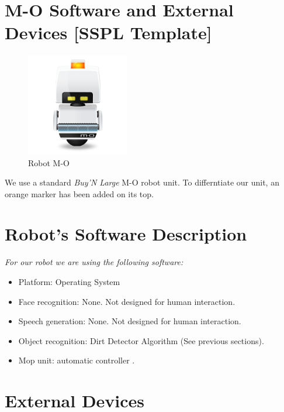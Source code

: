 \section*{M-O Software and External Devices [SSPL Template]}

\setlength\intextsep{0pt}
\begin{figure}
	\centering
	\includegraphics[width=0.4\textwidth]{images/m-o.png}
	\caption{Robot M-O}
	\label{fig:m-o}
\end{figure}

We use a standard \textit{Buy'N Large} M-O robot unit. To differntiate our unit, an orange marker has been added on its top.

\section*{Robot's Software Description}

\textit{For our robot we are using the following software:}

\begin{itemize}
	\item Platform: \BnL Operating System
	\item Face recognition: None. Not designed for human interaction.
	\item Speech generation: None. Not designed for human interaction.
	\item Object recognition: \BnL Dirt Detector Algorithm (See previous sections).
	\item Mop unit: \BnL automatic controller \cite{bnl2}.
\end{itemize}

\section*{External Devices}

